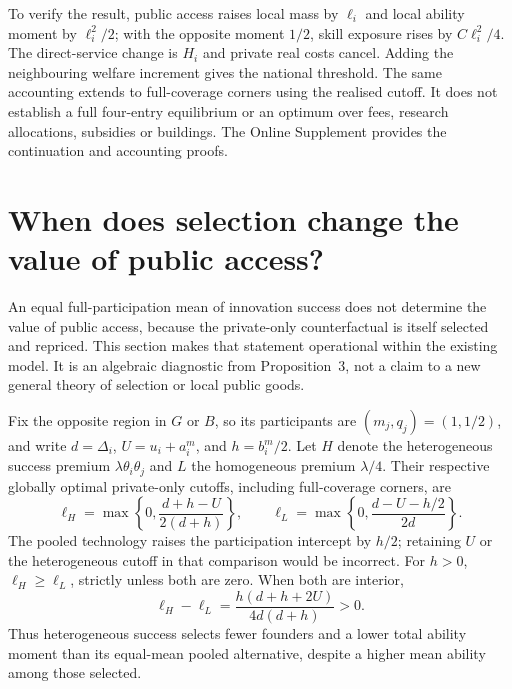 \documentclass[11pt]{article}
\begin{document}
To verify the result, public access raises local mass by $\ell_i$ and local ability moment by $\ell_i^2/2$; with the opposite moment $1/2$, skill exposure rises by $C\ell_i^2/4$.
The direct-service change is $H_i$ and private real costs cancel.
Adding the neighbouring welfare increment gives the national threshold.
The same accounting extends to full-coverage corners using the realised cutoff.
It does not establish a full four-entry equilibrium or an optimum over fees, research allocations, subsidies or buildings.
The Online Supplement provides the continuation and accounting proofs.

\section{When does selection change the value of public access?}\label{sec:diagnostic}

An equal full-participation mean of innovation success does not determine the value of public access, because the private-only counterfactual is itself selected and repriced.
This section makes that statement operational within the existing model.
It is an algebraic diagnostic from Proposition~3, not a claim to a new general theory of selection or local public goods.

Fix the opposite region in $G$ or $B$, so its participants are $(m_j,q_j)=(1,1/2)$, and write $d=\Delta_i$, $U=u_i+a_i^m$, and $h=b_i^m/2$.
Let $H$ denote the heterogeneous success premium $\lambda\theta_i\theta_j$ and $L$ the homogeneous premium $\lambda/4$.
Their respective globally optimal private-only cutoffs, including full-coverage corners, are
\begin{equation}
 \ell_H=\max\left\{0,\frac{d+h-U}{2(d+h)}\right\},\qquad
 \ell_L=\max\left\{0,\frac{d-U-h/2}{2d}\right\}.
 \label{eq:diagnostic-cuts}
\end{equation}
The pooled technology raises the participation intercept by $h/2$; retaining $U$ or the heterogeneous cutoff in that comparison would be incorrect.
For $h>0$, $\ell_H\geq\ell_L$, strictly unless both are zero.
When both are interior,
\begin{equation}
 \ell_H-\ell_L=\frac{h(d+h+2U)}{4d(d+h)}>0.
 \label{eq:diagnostic-cutgap}
\end{equation}
Thus heterogeneous success selects fewer founders and a lower total ability moment than its equal-mean pooled alternative, despite a higher mean ability among those selected.
\end{document}
